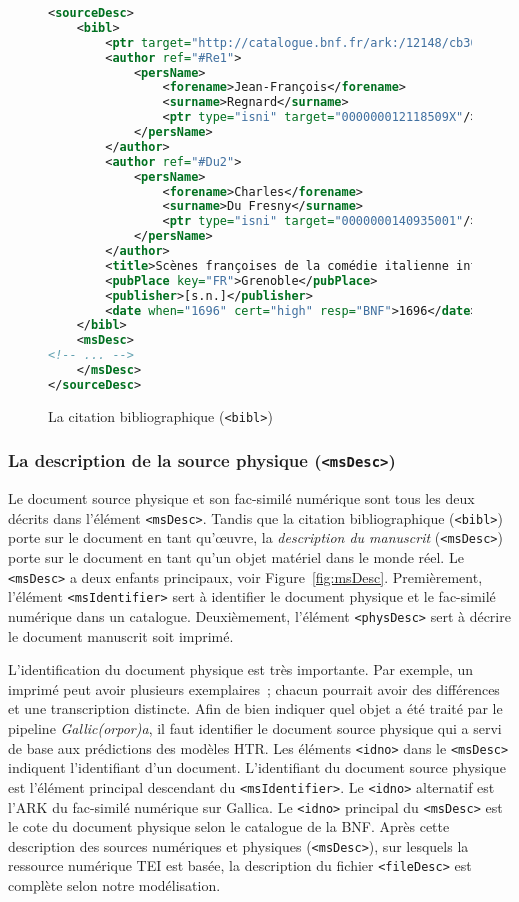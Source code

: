 \documentclass[class=article, crop=false]{standalone}
\begin{document}
\begin{figure}[htp]
\centering
\begin{lstlisting}[language=XML]
<sourceDesc>
	<bibl>
		<ptr target="http://catalogue.bnf.fr/ark:/12148/cb30369299r"/>
		<author ref="#Re1">
			<persName>
				<forename>Jean-François</forename>
				<surname>Regnard</surname>
				<ptr type="isni" target="000000012118509X"/>
			</persName>
		</author>
		<author ref="#Du2">
			<persName>
				<forename>Charles</forename>
				<surname>Du Fresny</surname>
				<ptr type="isni" target="0000000140935001"/>
			</persName>
		</author>
		<title>Scènes françoises de la comédie italienne intitulée "la Foire S.-Germain" , comme elles ont paru dans les premières représentations</title>
		<pubPlace key="FR">Grenoble</pubPlace>
		<publisher>[s.n.]</publisher>
		<date when="1696" cert="high" resp="BNF">1696</date>
	</bibl>
	<msDesc>
<!-- ... -->
	</msDesc>
</sourceDesc>

\end{lstlisting}
\caption{La citation bibliographique (\texttt{<bibl>})}
\label{fig:bibl}
\end{figure}


\subsubsection{La description de la source physique (\texttt{<msDesc>})}
Le document source physique et son fac-similé numérique sont tous les deux décrits dans l'élément \texttt{<msDesc>}. Tandis que la citation bibliographique (\texttt{<bibl>}) porte sur le document en tant qu'œuvre, la \textit{description du manuscrit} (\texttt{<msDesc>}) porte sur le document en tant qu'un objet matériel dans le monde réel. Le \texttt{<msDesc>} a deux enfants principaux, voir Figure~\ref{fig:msDesc}. Premièrement, l'élément \texttt{<msIdentifier>} sert à identifier le document physique et le fac-similé numérique dans un catalogue. Deuxièmement, l'élément \texttt{<physDesc>} sert à décrire le  document manuscrit soit imprimé.

L'identification du document physique est très importante. Par exemple, un imprimé peut avoir plusieurs exemplaires~; chacun pourrait avoir des différences et une transcription distincte. Afin de bien indiquer quel objet a été traité par le pipeline \textit{Gallic(orpor)a}, il faut identifier le document source physique qui a servi de base aux prédictions des modèles \acrshort{HTR}. Les éléments \texttt{<idno>} dans le \texttt{<msDesc>} indiquent l'identifiant d'un document. L'identifiant du document source physique est l'élément principal descendant du \texttt{<msIdentifier>}.  Le \texttt{<idno>} alternatif est l'\acrshort{ARK} du fac-similé numérique sur Gallica. Le \texttt{<idno>} principal du \texttt{<msDesc>} est le cote du document physique selon le catalogue de la \acrlong{BNF}. Après cette description des sources numériques et physiques (\texttt{<msDesc>}), sur lesquels la ressource numérique \acrshort{TEI} est basée, la description du fichier \texttt{<fileDesc>} est complète selon notre modélisation.
\end{document}
